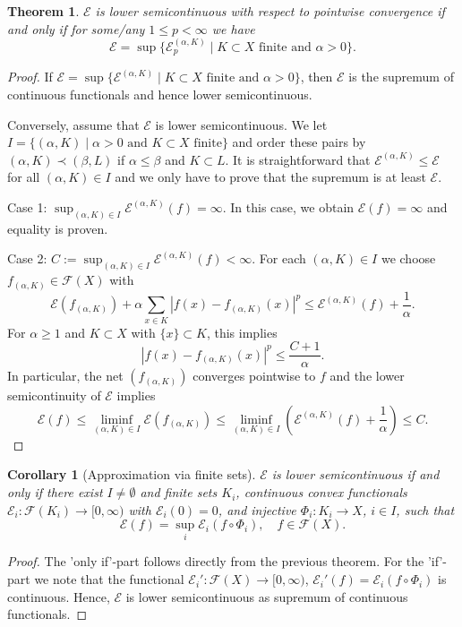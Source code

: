 \documentclass[a4paper,11pt,reqno]{amsart}
\newtheorem{theorem}[lemma]{Theorem}
\newtheorem{corollary}[lemma]{Corollary}
\theoremstyle{definition}
\numberwithin{equation}{section}
\newcommand{\cE}{{\mathcal E}}
\newcommand{\cF}{{\mathcal F}}
\newcommand{\1}{\mathds{1}}
\begin{document}
\begin{theorem}\label{theorem:approximating forms}
$\cE$ is lower semicontinuous with respect to pointwise convergence if and only if for some/any $1 \leq p < \infty$ we have
%
$$\cE = \sup \{\cE_p^{(\alpha,K)} \mid K \subset X \text{ finite  and } \alpha > 0\}. $$
%
\end{theorem}
\begin{proof}
If $\cE = \sup \{\cE^{(\alpha,K)} \mid K \subset X \text{ finite  and } \alpha > 0\}$, then $\cE$ is the supremum of continuous functionals and hence lower semicontinuous. 

Conversely, assume that $\cE$ is lower semicontinuous. We let $I = \{(\alpha,K) \mid \alpha > 0 \text{ and } K \subset X \text{ finite}\}$ and order these pairs by $(\alpha,K) \prec (\beta,L)$ if  $\alpha \leq \beta$ and $K \subset L$. It is straightforward that $\cE^{(\alpha,K)} \leq \cE$ for all $(\alpha,K) \in I$ and we only have to prove that the supremum is at least   $\cE$. 

Case 1: $\sup_{(\alpha,K)\in I} \cE^{(\alpha,K)} (f)  = \infty$. In this case, we obtain $\cE(f) =  \infty$ and equality is proven. 

Case 2: $C := \sup_{(\alpha,K)\in I} \cE^{(\alpha,K)} (f) < \infty$. For each $(\alpha,K) \in I$ we choose $f_{(\alpha,K)} \in \cF(X)$ with 
%
$$\cE(f_{(\alpha,K)}) + \alpha \sum_{x \in K} |f(x) - f_{(\alpha,K)}(x)|^p \leq \cE^{(\alpha,K)}(f) + \frac{1}{\alpha}.$$
%
For $\alpha \geq 1$ and $K \subset X$ with $\{x\} \subset K$, this implies 
%
$$  |f(x) - f_{(\alpha,K)}(x)|^p \leq \frac{C + 1}{\alpha}.$$
%
In particular, the net $(f_{(\alpha,K)})$ converges pointwise to $f$ and the lower semicontinuity of $\cE$ implies
%
$$\cE(f) \leq \liminf_{(\alpha,K) \in I} \cE(f_{(\alpha,K)}) \leq  \liminf_{(\alpha,K) \in I} \left(\cE^{(\alpha,K)}(f) + \frac{1}{\alpha}\right) \leq C. $$
%
\end{proof}





\begin{corollary}[Approximation via finite sets] \label{corollary:approximation via finite subsets}
 $\cE$ is lower semicontinuous if and only if there exist $I \neq \emptyset$ and finite sets $K_i$, continuous convex functionals $\cE_i \colon \cF(K_i) \to [0,\infty)$ with $\cE_i(0) = 0$, and  injective $\Phi_i \colon K_i \to X$, $i \in I$, such that 
 $$\cE(f) = \sup_i \cE_i (f  \circ \Phi_i), \quad f \in \cF(X). $$
\end{corollary}
\begin{proof}
The 'only if'-part follows directly from the previous theorem. For the 'if'-part we note that the functional $\cE_i' \colon \cF(X) \to [0,\infty)$, $\cE_i'(f) = \cE_i(f \circ \Phi_i)$ is continuous. Hence, $\cE$ is lower semicontinuous as supremum of continuous functionals. 
\end{proof}
\end{document}
